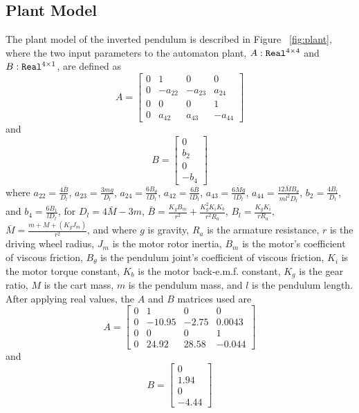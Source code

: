\documentclass[conference]{IEEEtran}
\begin{document}
\subsection{Plant Model}

The plant model of the inverted pendulum is described in Figure ~\ref{fig:plant}, where the two input parameters to the automaton plant, $A:{\operatorname{\texttt{Real}}}^{4\times 4}$ and $B:{\operatorname{\texttt{Real}}}^{4\times 1}$, are defined as 
\begin{equation}
A=\left[ \begin{array}{cccc} 0 & 1 & 0 & 0 \\ 0 & -a_{22} & -a_{23} & a_{24} \\ 0 & 0 & 0 & 1 \\ 0 & a_{42} & a_{43} & -a_{44} \end{array} \right]
\label{eq:systemMatrix}
\end{equation}
and
\begin{equation}
B=\left[ \begin{array}{c} 0 \\ b_{2} \\ 0 \\ -b_{4} \end{array} \right]
\label{eq:inputMatrix}
\end{equation} where $a_{22}=\frac{4\bar{B}}{D_l}$, $a_{23}=\frac{3mg}{D_l}$, $a_{24}=\frac{6B_{\theta}}{lD_l}$, $a_{42}=\frac{6\bar{B}}{lD_l}$, $a_{43}=\frac{6\bar{M}g}{lD_l}$, $a_{44}=\frac{12\bar{M}B_{\theta}}{ml^2D_l}$, 
$b_2=\frac{4B_l}{D_l}$, and $b_4=\frac{6B_1}{lD_l}$, 
for $D_l=4\bar{M}-3m$, 
$\bar{B}=\frac{K_gB_m}{r^2}+\frac{K_g^2K_iK_b}{r^2R_a}$, 
$B_l=\frac{K_gK_i}{rR_a}$,
$\bar{M}=\frac{m+M+(K_gJ_m)}{r^2}$, and where  
$g$ is gravity,
$R_a$ is the armature resistance,
$r$ is the driving wheel radius,
$J_m$ is the motor rotor inertia,
$B_m$ is the motor's coefficient of viscous friction,
$B_{\theta}$ is the pendulum joint's coefficient of viscous friction,
$K_i$ is the motor torque constant,
$K_b$ is the motor back-e.m.f. constant,
$K_g$ is the gear ratio,
$M$ is the cart mass, 
$m$ is the pendulum mass, and
$l$ is the pendulum length.  After applying real values, the $A$ and $B$ matrices used are 
\begin{equation}
A=\left[ \begin{array}{cccc} 0 & 1 & 0 & 0 \\ 0 & -10.95 & -2.75 & 0.0043 \\ 0 & 0 & 0 & 1 \\ 0 & 24.92 & 28.58 & -0.044 \end{array} \right]
\label{eq:systemMatrixReal}
\end{equation} and
\begin{equation}
B=\left[ \begin{array}{c} 0 \\ 1.94 \\ 0 \\ -4.44 \end{array} \right]
\label{eq:inputMatrixReal}
\end{equation}
\end{document}
